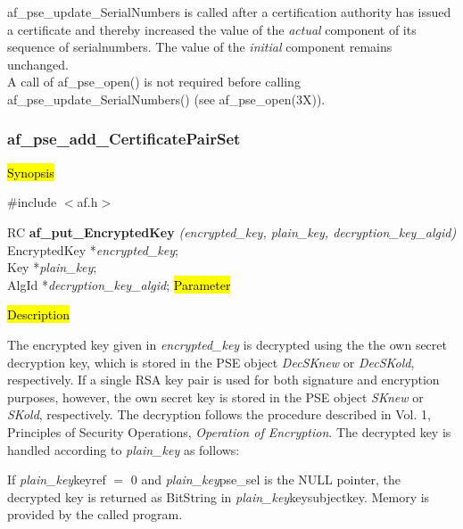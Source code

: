 af\_pse\_update\_SerialNumbers is called after a certification authority has issued a
certificate and thereby increased the value of the {\em actual} component of its sequence of
serialnumbers. The value of the {\em initial} component remains unchanged.
\\ [1em]
A call of af\_pse\_open() is not required before calling af\_pse\_update\_SerialNumbers()
(see af\_pse\_open(3X)).


\subsubsection{af\_pse\_add\_CertificatePairSet}
\label{af_put_EncryptedKey}

\hl{Synopsis}

\#include $<$af.h$>$ 

RC {\bf af\_put\_EncryptedKey} {\em (encrypted\_key, plain\_key, decryption\_key\_algid)} \\
EncryptedKey *{\em encrypted\_key}; \\
Key *{\em plain\_key}; \\
AlgId *{\em decryption\_key\_algid};
\hl{Parameter}




\hl{Description}

The encrypted key given in {\em encrypted\_key} is decrypted using the
the own secret decryption key, which is stored in the PSE object
{\em DecSKnew} or {\em DecSKold}, respectively. If a single RSA key pair is used for both signature and encryption
purposes, however, the own secret key is stored in the PSE object {\em SKnew} or {\em SKold}, respectively.
The decryption follows the procedure described in Vol. 1, Principles of Security Operations, 
{\em Operation of Encryption}.
The decrypted key is handled according to {\em plain\_key} as follows:

If {\em plain\_key}\pf keyref $=$ 0 and {\em plain\_key}\pf pse\_sel is the NULL pointer, the decrypted key is
returned as BitString in {\em plain\_key}\pf key\pf subjectkey. Memory is provided by the called program. 

